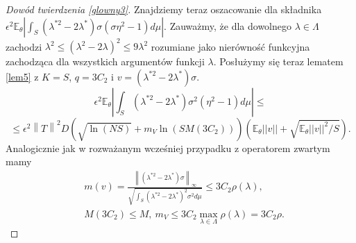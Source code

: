 \documentclass[man,mfiu]{mgrwms}
\newcommand{\norm}[1]{\left\lVert#1\right\rVert}
\begin{document}
\begin{proof}[Dowód twierdzenia \ref{glowny3}]
Znajdziemy teraz oszacowanie dla składnika $\epsilon^2\mathbb{E}_{\theta}\left|\int_S(\lambda^{*2}-2\lambda^*)\sigma(\sigma\eta^2-1)d\mu\right|$. Zauważmy, że  dla dowolnego $\lambda\in \Lambda$ zachodzi $\lambda^2\leq (\lambda^2-2\lambda)^2\leq 9\lambda^2$ rozumiane jako nierówność funkcyjna zachodząca dla wszystkich argumentów funkcji $\lambda$. Posłużymy się teraz lematem \ref{lem5} z $K=S$, $q=3C_2$ i $v=(\lambda^{*2}-2\lambda^*)\sigma$. 
\begin{displaymath}
\epsilon^2\mathbb{E}_{\theta}\left|\int_S(\lambda^{*2}-2\lambda^*)\sigma^2(\eta^2-1)d\mu\right|\leq
\end{displaymath}
\begin{displaymath}
\leq \epsilon^2\norm{T}^2D\left(\sqrt{\ln (NS)}+m_V\ln (SM(3C_2))\right)\left(\mathbb{E}_{\theta}||v||+\sqrt{\mathbb{E}_{\theta}||v||^2/S}\right).
\end{displaymath}
Analogicznie jak w rozważanym wcześniej przypadku z operatorem zwartym mamy
\begin{displaymath}
\begin{split}
&m(v)=\frac{\norm{(\lambda^{*2}-2\lambda^*)\sigma}_{\infty}}{\sqrt{\int_S(\lambda^{*2}-2\lambda^*)^2\sigma^2d\mu}}\leq 3C_2\rho (\lambda),\\
& M(3C_2)\leq M,\ m_V\leq 3C_2\max_{\lambda\in \Lambda}\rho(\lambda)=3C_2\rho.
\end{split}
\end{displaymath}


\end{proof}
\end{document}
